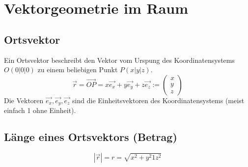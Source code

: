 \section{Vektorgeometrie im Raum}

\subsection{Ortsvektor}
Ein Ortsvektor beschreibt den Vektor vom Urspung des Koordinatensystems $O(0|0|0)$ zu einem beliebigen Punkt $P(x|y|z)$.
\[	\boxed{ \vec{r} = \overrightarrow{OP} = x\vec{e_x} + y\vec{e_y} + z\vec{e_z} :=
	\left( 
	  \begin{array}{ccc} 
	    x \\ y \\ z
	  \end{array}
	\right) }
\]
\noindent
Die Vektoren $\vec{e_x},\vec{e_y},\vec{e_z}$ sind die Einheitsvektoren des Koordinatensystems (meist einfach 1 ohne Einheit).
\subsection{Länge eines Ortsvektors (Betrag)}
\[ \boxed{ |\vec{r}| = r = \sqrt{x^2 + y^2 1 z^2} } \]

